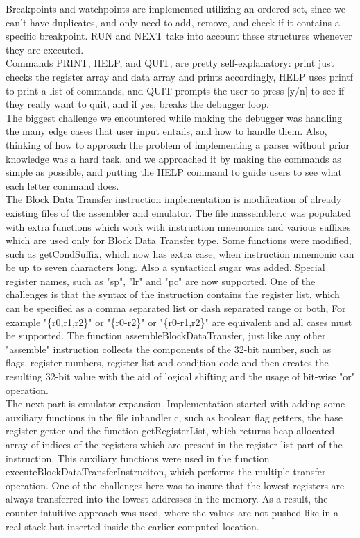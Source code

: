 \documentclass[11pt]{article}
\begin{document}
Breakpoints and watchpoints are implemented utilizing an ordered set, since we can't have duplicates, and only need to add, remove, and check if it contains a specific breakpoint. RUN and NEXT take into account these structures whenever they are executed. \\

Commands PRINT, HELP, and QUIT, are pretty self-explanatory: print just checks the register array and data array and prints accordingly, HELP uses printf to print a list of commands, and QUIT prompts the user to press [y/n] to see if they really want to quit, and if yes, breaks the debugger loop.\\

The biggest challenge we encountered while making the debugger was handling the many edge cases that user input entails, and how to handle them. Also, thinking of how to approach the problem of implementing a parser without prior knowledge was a hard task, and we approached it by making the commands as simple as possible, and putting the HELP command to guide users to see what each letter command does. \\

The Block Data Transfer instruction implementation is modification of already existing files of the assembler and emulator. The file inassembler.c was populated with extra functions which work with instruction mnemonics and various suffixes which are used only for Block Data Transfer type. Some functions were modified, such as getCondSuffix, which now has extra case, when instruction mnemonic can be up to seven characters long. Also a syntactical sugar was added. Special register names, such as "sp", "lr" and "pc" are now supported. One of the challenges is that the syntax of the instruction contains the register list, which can be specified as a comma separated list or dash separated range or both, For example "\{r0,r1,r2\}" or "\{r0-r2\}" or "\{r0-r1,r2\}" are equivalent and all cases must be supported. The function assembleBlockDataTransfer, just like any other "assemble" instruction collects the components of the 32-bit number, such as flags, register numbers, register list and condition code and then creates the resulting 32-bit value with the aid of logical shifting and the usage of bit-wise "or" operation. \\

The next part is emulator expansion. Implementation started with adding some auxiliary functions in the file inhandler.c, such as boolean flag getters, the base register getter and the function getRegisterList, which returns heap-allocated array of indices of the registers which are present in the register list part of the instruction. This auxiliary functions were used in the function executeBlockDataTransferInstruciton, which performs the multiple transfer operation. One of the challenges here was to insure that the lowest registers are always transferred into the lowest addresses in the memory. As a result, the counter intuitive approach was used, where the values are not pushed like in a real stack but inserted inside the earlier computed location.  \\
\end{document}
